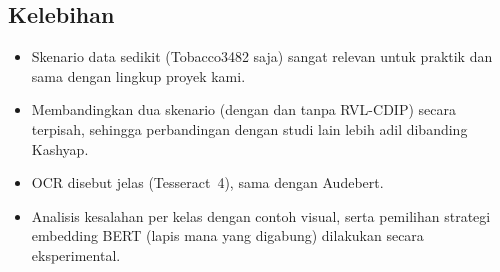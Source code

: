 \subsection{Kelebihan}
\begin{itemize}
  \item Skenario data sedikit (Tobacco3482 saja) sangat relevan untuk praktik dan sama
        dengan lingkup proyek kami.
  \item Membandingkan dua skenario (dengan dan tanpa RVL-CDIP) secara terpisah, sehingga
        perbandingan dengan studi lain lebih adil dibanding Kashyap.
  \item OCR disebut jelas (Tesseract~4), sama dengan Audebert.
  \item Analisis kesalahan per kelas dengan contoh visual, serta pemilihan strategi
        embedding BERT (lapis mana yang digabung) dilakukan secara eksperimental.
\end{itemize}

